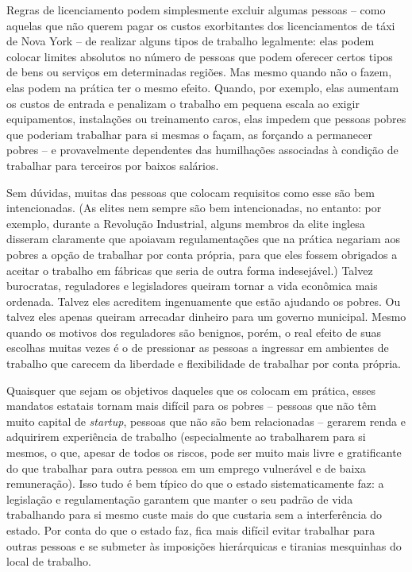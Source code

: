 Regras de licenciamento podem simplesmente excluir algumas pessoas -- como aquelas que não querem pagar os custos exorbitantes dos licenciamentos de táxi de Nova York -- de realizar alguns tipos de trabalho legalmente: elas podem colocar limites absolutos no número de pessoas que podem oferecer certos tipos de bens ou serviços em determinadas regiões. Mas mesmo quando não o fazem, elas podem na prática ter o mesmo efeito. Quando, por exemplo, elas aumentam os custos de entrada e penalizam o trabalho em pequena escala ao exigir equipamentos, instalações ou treinamento caros, elas impedem que pessoas pobres que poderiam trabalhar para si mesmas o façam, as forçando a permanecer pobres -- e provavelmente dependentes das humilhações associadas à condição de trabalhar para terceiros por baixos salários.

Sem dúvidas, muitas das pessoas que colocam requisitos como esse são bem intencionadas. (As elites nem sempre são bem intencionadas, no entanto: por exemplo, durante a Revolução Industrial, alguns membros da elite inglesa disseram claramente que apoiavam regulamentações que na prática negariam aos pobres a opção de trabalhar por conta própria, para que eles fossem obrigados a aceitar o trabalho em fábricas que seria de outra forma indesejável.) Talvez burocratas, reguladores e legisladores queiram tornar a vida econômica mais ordenada. Talvez eles acreditem ingenuamente que estão ajudando os pobres. Ou talvez eles apenas queiram arrecadar dinheiro para um governo municipal. Mesmo quando os motivos dos reguladores são benignos, porém, o real efeito de suas escolhas muitas vezes é o de pressionar as pessoas a ingressar em ambientes de trabalho que carecem da liberdade e flexibilidade de trabalhar por conta própria.

Quaisquer que sejam os objetivos daqueles que os colocam em prática, esses mandatos estatais tornam mais difícil para os pobres -- pessoas que não têm muito capital de \emph{startup}, pessoas que não são bem relacionadas -- gerarem renda e adquirirem experiência de trabalho (especialmente ao trabalharem para si mesmos, o que, apesar de todos os riscos, pode ser muito mais livre e gratificante do que trabalhar para outra pessoa em um emprego vulnerável e de baixa remuneração). Isso tudo é bem típico do que o estado sistematicamente faz: a legislação e regulamentação garantem que manter o seu padrão de vida trabalhando para si mesmo custe mais do que custaria sem a interferência do estado. Por conta do que o estado faz, fica mais difícil evitar trabalhar para outras pessoas e se submeter às imposições hierárquicas e tiranias mesquinhas do local de trabalho.

